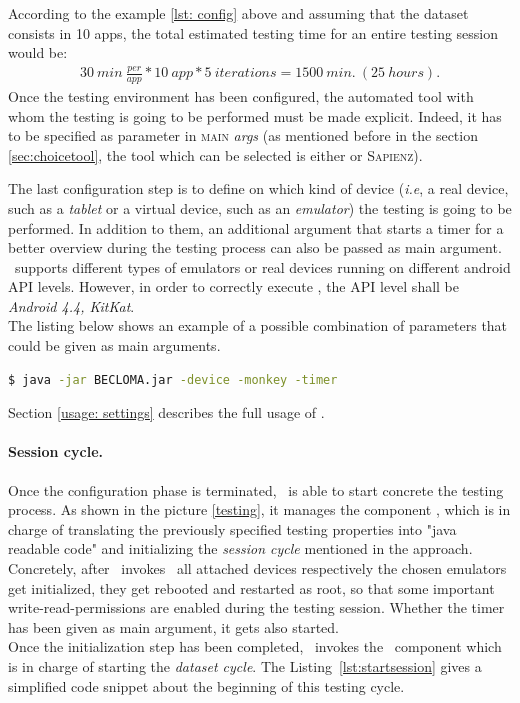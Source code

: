 According to the example \ref{lst: config} above and assuming that the dataset consists in 10 apps, the total estimated testing time for an entire testing session would be: 
\begin{align*}
30 \:min \: \frac{per}{app} * 10\: app * 5\: iterations = 1500 \:min. \:(25\: hours). 
\end{align*}
Once the testing environment has been configured, the automated tool with whom the testing is going to be performed must be made explicit. 
Indeed, it has to be specified as parameter in \textsc{main} \textit{args} (as mentioned before in the section \ref{sec:choicetool}, the tool which can be selected is either \monkey or \textsc{Sapienz}).

The last configuration step is to define on which kind of device (\textit{i.e}, a real device, such as a \textit{tablet} or a virtual device, such as an \textit{emulator}) the testing is going to be performed. In addition to them, an additional argument that starts a timer for a better overview during the testing process can also be passed as main argument. \toolname\ supports different types of emulators or real devices running on different android API levels. However, in order to correctly execute \sapienz, the API level shall be \textit{Android 4.4, KitKat}. \\
The listing below shows an example of a possible combination of parameters that could be given as main arguments. 
\begin{lstlisting}[caption=Possible \toolname\ command line, language=bash]
$ java -jar BECLOMA.jar -device -monkey -timer
\end{lstlisting}
Section \ref{usage: settings} describes the full usage of \toolname. 

\paragraph{Session cycle.} Once the configuration phase is terminated, \toolname\ is able to start concrete the testing process. 
As shown in the picture \ref{testing}, it manages the component \SessionLauncher, which is in charge of translating the previously specified testing properties into "java readable code" and initializing the \textit{session cycle} mentioned in the approach. 
Concretely, after \toolname\ invokes \SessionLauncher\ all attached devices respectively the chosen emulators get initialized, \ie they get rebooted and restarted as root, so that some important write-read-permissions are enabled during the testing session. 
Whether the timer has been given as main argument, it gets also started. \\
Once the initialization step has been completed, \SessionLauncher\  invokes the \AppTester\ component which is in charge of starting the \textit{dataset cycle}. The Listing~\ref{lst:startsession} gives a simplified code snippet about the beginning of this testing cycle. 

